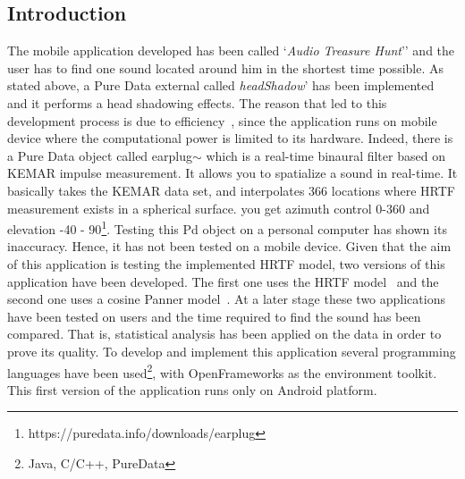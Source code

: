 \documentclass[journal]{IEEEtran}
\begin{document}
\subsection{Introduction}
The mobile application developed has been called `\emph{Audio Treasure Hunt}'' and the user has to find one sound located around him in the shortest time possible. As stated above, a Pure Data external called \textit{headShadow}' has been implemented and it performs a head shadowing effects. The reason that led to this development process is due to efficiency~\cite{aroundMe}, since the application runs on mobile device where the computational power is limited to its hardware. Indeed, there is a Pure Data object called earplug$\sim$ which is a real-time binaural filter based on KEMAR impulse measurement. It allows you to spatialize a sound in real-time. It basically takes the KEMAR data set, and interpolates 366 locations where HRTF measurement exists in a spherical surface. you get azimuth control 0-360 and elevation -40 - 90\footnote{https://puredata.info/downloads/earplug}. Testing this Pd object on a personal computer has shown its inaccuracy. Hence, it has not been tested on a mobile device. 
Given that the aim of this application is testing the implemented HRTF model, two versions of this application have been developed. The first one uses the HRTF model~\cite{Brown1997} and the second one uses a cosine Panner model~\cite{AndyFarnell2010}.
At a later stage these two applications have been tested on users and the time required to find the sound has been compared. That is, statistical analysis has been applied on the data in order to prove its quality. To develop and implement this application several programming languages have been used\footnote{Java, C/C++, PureData}, with OpenFrameworks as the environment toolkit. This first version of the application runs only on Android platform.


\end{document}

